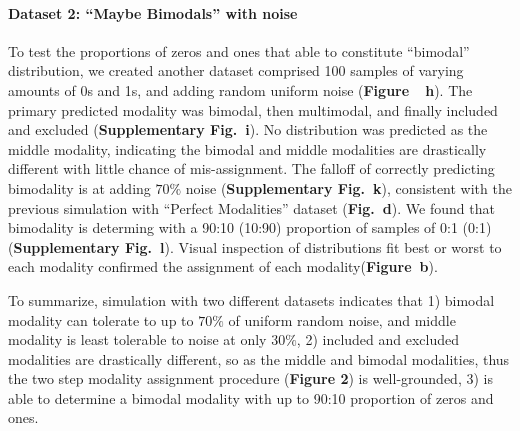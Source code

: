 \paragraph{Dataset 2: ``Maybe Bimodals'' with noise}
\label{sec:anchor_maybe_bimodals}

To test the proportions of zeros and ones that able to constitute ``bimodal'' distribution, we created another dataset comprised 100 samples of varying amounts of 0s and 1s, and adding random uniform noise (\textbf{Figure~~h}). The primary predicted modality was bimodal, then multimodal, and finally included and excluded (\textbf{Supplementary Fig.~i}). No distribution was predicted as the middle modality, indicating the bimodal and middle modalities are drastically different with little chance of mis-assignment. The falloff of correctly predicting bimodality is at adding $70\%$ noise (\textbf{Supplementary Fig.~k}), consistent with the previous simulation with ``Perfect Modalities'' dataset (\textbf{Fig.~d}). We found that bimodality is determing with a 90:10 (10:90) proportion of samples of 0:1 (0:1) (\textbf{Supplementary Fig.~l}). Visual inspection of distributions fit best or worst to each modality confirmed the assignment of each modality(\textbf{Figure~b}).

To summarize, simulation with two different datasets indicates that 1) bimodal modality can tolerate to up to $70\%$ of uniform random noise, and middle modality is least tolerable to noise at only $30\%$, 2) included and excluded modalities are drastically different, so as the middle and bimodal modalities, thus the two step modality assignment procedure (\textbf{Figure 2}) is well-grounded, 3) \anchor is able to determine a bimodal modality with up to 90:10 proportion of zeros and ones.



